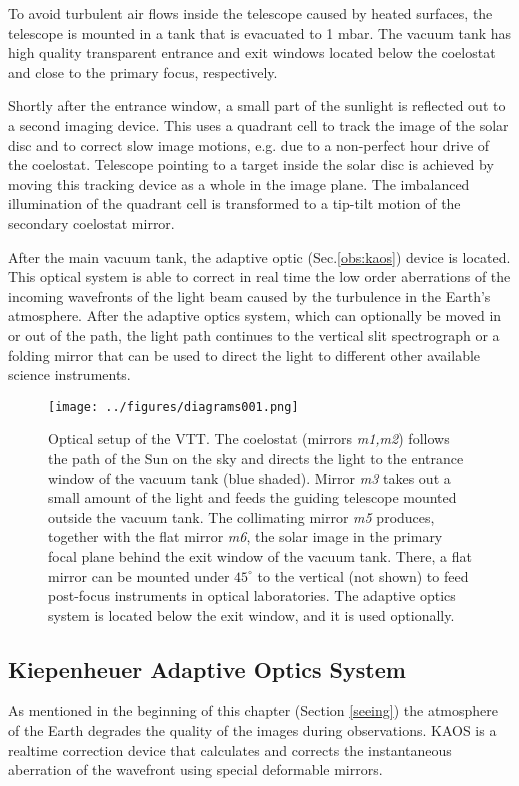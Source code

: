 To avoid turbulent air flows inside the telescope caused by heated surfaces, the telescope is mounted in a tank that is evacuated to 1 mbar. The vacuum tank has high quality transparent entrance and exit windows located below the coelostat and close to the primary focus, respectively.

Shortly after the entrance window, a small part of the sunlight is reflected out to a second imaging device. This uses a quadrant cell to track the image of the solar disc and to correct slow image motions, e.g. due to a non-perfect hour drive of the coelostat. Telescope pointing to a target inside the solar disc is achieved by moving this tracking device as a whole in the image plane. The imbalanced illumination of the quadrant cell is transformed to a tip-tilt motion of the secondary coelostat mirror.

After the main vacuum tank, the adaptive optic (Sec.\ref{obs:kaos}) device is located. This optical system is able to correct in real time the low order aberrations of the incoming wavefronts of the light beam caused by the turbulence in the Earth's atmosphere. After the adaptive optics system, which can optionally be moved in or out of the path, the light path continues to the vertical slit spectrograph or a folding mirror that can be used to direct the light to different other available science instruments.
\begin{figure}[t]
\begin{center}
\texttt{[image: ../figures/diagrams001.png]}
\caption{Optical setup of the VTT. The coelostat (mirrors \emph{m1,m2}) follows the path of the Sun on the sky and directs the light to the entrance window of the vacuum tank (blue shaded). Mirror \emph{m3} takes out a small amount of the light and feeds the guiding telescope mounted outside the vacuum tank. The collimating mirror \emph{m5} produces, together with the flat mirror \emph{m6}, the solar image in the primary focal plane behind the exit window of the vacuum tank. There, a flat mirror can be mounted under $45^{\circ}$ to the vertical (not shown) to feed post-focus instruments in optical laboratories. The adaptive optics system is located below the exit window, and it is used optionally. }
\label{fig:vtt:optical}
\end{center}
\end{figure}


\subsection{Kiepenheuer Adaptive Optics System\label{obs:kaos}}
As mentioned in the beginning of this chapter (Section \ref{seeing}) the atmosphere of the Earth degrades the quality of the images during observations. KAOS \citep[Kiepenheuer Adaptive Optics System, ][]{2003SPIE.4853..187V,2007msfa.conf..107B} is a realtime correction device that calculates and corrects the instantaneous aberration of the wavefront using special deformable mirrors.

